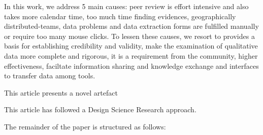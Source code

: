\documentclass{article}
\begin{document}
In this work, we address 5 main causes: peer review is effort intensive and also takes more calendar time, too much time finding evidences, geographically distributed-teams, data problems and data extraction forms are fulfilled manually or require too many mouse clicks. To lessen these causes, we resort to provides a basis for establishing credibility and validity, make the examination of qualitative data more complete and rigorous, it is a requirement from the community, higher effectiveness, faciltate information sharing and knowledge exchange and interfaces to transfer data among tools. 
    
This article presents a novel artefact
    

    

      
This article has followed a Design Science Research approach.

The remainder of the paper is structured as follows: 

    
      


\end{document}
